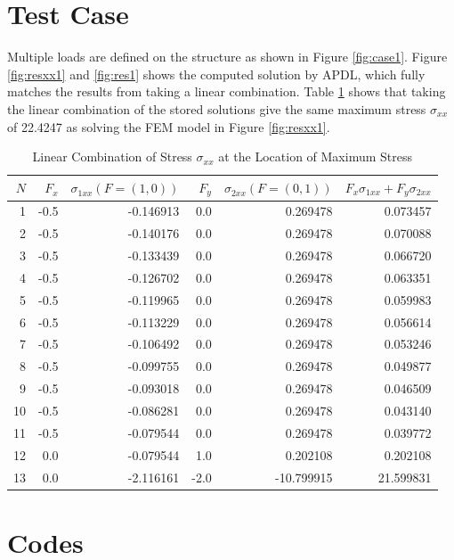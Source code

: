 \documentclass[letterpaper,12pt,]{article}
\begin{document}
\section*{Test Case}

Multiple loads are defined on the structure as shown in Figure \ref{fig:case1}. Figure \ref{fig:resxx1} and \ref{fig:res1} shows the computed solution by APDL, which fully matches the results from taking a linear combination. Table \ref{tab:lincomb} shows that taking the linear combination of the stored solutions give the same maximum stress $\sigma_{xx}$ of 22.4247 as solving the FEM model in Figure \ref{fig:resxx1}.

\begin{table}[h]
\centering
\begin{tabular}{r|rr|rr|r} \toprule
    {$N$} & {$F_x$} & {$\sigma_{1xx}(F = (1,0))$} & {$F_y$} & {$\sigma_{2xx}(F=(0,1))$} & {$F_x\sigma_{1xx}+F_y\sigma_{2xx}$}\\ \midrule
1 & -0.5 & -0.146913 & 0.0 & 0.269478 & 0.073457 \\
2 & -0.5 & -0.140176 & 0.0 & 0.269478 & 0.070088 \\
3 & -0.5 & -0.133439 & 0.0 & 0.269478 & 0.066720 \\
4 & -0.5 & -0.126702 & 0.0 & 0.269478 & 0.063351 \\
5 & -0.5 & -0.119965 & 0.0 & 0.269478 & 0.059983 \\
6 & -0.5 & -0.113229 & 0.0 & 0.269478 & 0.056614 \\
7 & -0.5 & -0.106492 & 0.0 & 0.269478 & 0.053246 \\
8 & -0.5 & -0.099755 & 0.0 & 0.269478 & 0.049877 \\
9 & -0.5 & -0.093018 & 0.0 & 0.269478 & 0.046509 \\
10 & -0.5 & -0.086281 & 0.0 & 0.269478 & 0.043140 \\
11 & -0.5 & -0.079544 & 0.0 & 0.269478 & 0.039772 \\
12 & 0.0 & -0.079544 & 1.0 & 0.202108 & 0.202108 \\
13 & 0.0 & -2.116161 & -2.0 & -10.799915 & 21.599831 \\
\bottomrule
\end{tabular}
\caption{Linear Combination of Stress $\sigma_{xx}$ at the Location of Maximum Stress}
\label{tab:lincomb}
\end{table}

\section*{Codes}
\end{document}
